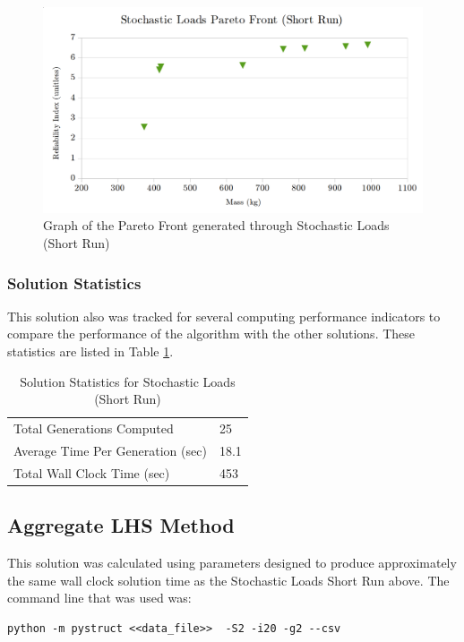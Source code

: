 \begin{figure}
\includegraphics[width=\textwidth]{img/pf_sto_short.png}
	\caption{Graph of the Pareto Front generated through Stochastic Loads (Short Run)}
\label{fig:pfront_sto_short}
\end{figure}

\subsubsection{Solution Statistics}
This solution also was tracked for several computing performance indicators to compare the performance of the algorithm with the other solutions. These statistics are listed in Table \ref{tab:stat_sto_short}. 

\begin{table}[!htbp]
  \centering
  \begin{tabular}{|l|l|}
    \hline
	  Total Generations Computed & 25\\
    Average Time Per Generation (sec) & 18.1\\
    Total Wall Clock Time (sec)	 & 453\\
    \hline
  \end{tabular}
	\caption{Solution Statistics for Stochastic Loads (Short Run)}
  \label{tab:stat_sto_short}
\end{table}

\subsection{Aggregate LHS Method}
This solution was calculated using parameters designed to produce approximately the same wall clock solution time as the Stochastic Loads Short Run above. The command line that was used was:

\begin{verbatim}
python -m pystruct <<data_file>>  -S2 -i20 -g2 --csv
\end{verbatim}

